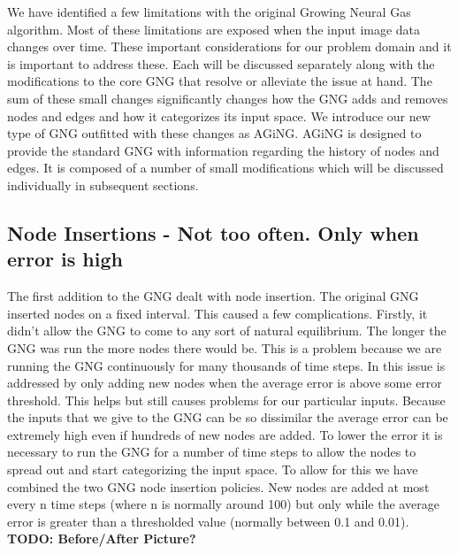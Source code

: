 \documentclass{article}
\renewcommand{\|}{\origbar} %
\begin{document}

We have identified a few limitations with the original Growing Neural Gas algorithm. Most of these limitations are exposed when the input image data changes over time. These important considerations for our problem domain and it is important to address these. Each will be discussed separately along with the modifications to the core GNG that resolve or alleviate the issue at hand. The sum of these small changes significantly changes how the GNG adds and removes nodes and edges and how it categorizes its input space. We introduce our new type of GNG outfitted with these changes as AGiNG. AGiNG is designed to provide the standard GNG with information regarding the history of nodes and edges. It is composed of a number of small modifications which will be discussed individually in subsequent sections.

\subsection{Node Insertions - Not too often. Only when error is high}

The first addition to the GNG dealt with node insertion. The original GNG inserted nodes on a fixed interval. This caused a few complications. Firstly, it didn't allow the GNG to come to any sort of natural equilibrium. The longer the GNG was run the more nodes there would be. This is a problem because we are running the GNG continuously for many thousands of time steps. In  this issue is addressed by only adding new nodes when the average error is above some error threshold. This helps but still causes problems for our particular inputs. Because the inputs that we give to the GNG can be so dissimilar the average error can be extremely high even if hundreds of new nodes are added. To lower the error it is necessary to run the GNG for a number of time steps to allow the nodes to spread out and start categorizing the input space. To allow for this we have combined the two GNG node insertion policies. New nodes are added at most every n time steps (where n is normally around 100) but only while the average error is greater than a thresholded value (normally between 0.1 and 0.01). {\bf TODO: Before/After Picture?}
\end{document}
